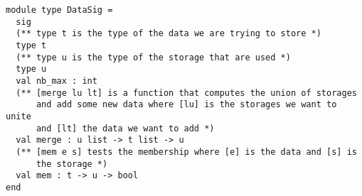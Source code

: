 \begin{lstlisting}
module type DataSig =
  sig
  (** type t is the type of the data we are trying to store *)
  type t
  (** type u is the type of the storage that are used *)
  type u
  val nb_max : int
  (** [merge lu lt] is a function that computes the union of storages
      and add some new data where [lu] is the storages we want to unite
      and [lt] the data we want to add *)
  val merge : u list -> t list -> u
  (** [mem e s] tests the membership where [e] is the data and [s] is
      the storage *)
  val mem : t -> u -> bool
end
\end{lstlisting}
